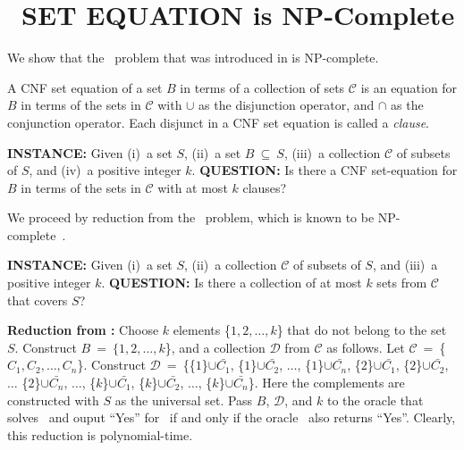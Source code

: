 \chapter{\textsf{\kcnf\ SET EQUATION} is NP-Complete}
\label{chapter:appendix:k-cnf}

We show that the \kcnfse\ problem that was introduced in
 is NP-complete. 

\begin{definition}
%
A CNF set equation of a set $B$ in terms of a collection of sets $\mathcal{C}$
is an equation for $B$ in terms of the sets in $\mathcal{C}$ with $\cup$ as the
disjunction operator, and $\cap$ as the conjunction operator. Each disjunct in
a CNF set equation is called a \textit{clause}.
%
\end{definition}


\begin{definition}
%
\textbf{INSTANCE:} Given (i)~a set $S$, (ii)~a set $B~\subseteq~S$, 
(iii)~a collection $\mathcal{C}$ of subsets of $S$, and (iv)~a positive
integer $k$.
%
\textbf{QUESTION:} Is there a CNF set-equation for $B$ in terms of the
sets in $\mathcal{C}$ with at most $k$ clauses?
%
\end{definition}

We proceed by reduction from the \setcov\ problem, which is known to be
NP-complete~\cite{garey-johnson}.


\begin{definition}
%
\textbf{INSTANCE:} Given (i)~a set $S$, (ii)~a collection $\mathcal{C}$ of
subsets of $S$, and (iii)~a positive integer $k$.
%
\textbf{QUESTION:} Is there a collection of at most $k$ sets from $\mathcal{C}$ 
that covers $S$?
%
\end{definition}



\noindent\textbf{Reduction from \setcov:} Choose $k$ elements
\{$1, 2, \ldots, k$\} that do not belong to the set $S$. Construct
$B~=~\{1, 2, \ldots, k$\}, and a collection $\mathcal{D}$ from $\mathcal{C}$ as
follows. Let $\mathcal{C}$~=~\{$C_1, C_2, \ldots, C_n$\}.  Construct
$\mathcal{D}$~=~\{\{$1$\}$\cup$$\bar{C_1}$, \{$1$\}$\cup$$\bar{C_2}$, $\ldots$,
\{$1$\}$\cup$$\bar{C_n}$, \{$2$\}$\cup$$\bar{C_1}$, \{$2$\}$\cup$$\bar{C_2}$,
$\ldots$ \{$2$\}$\cup$$\bar{C_n}$, $\ldots$, \{$k$\}$\cup$$\bar{C_1}$,
\{$k$\}$\cup$$\bar{C_2}$, $\ldots$, \{$k$\}$\cup$$\bar{C_n}$\}. Here the
complements are constructed with $S$ as the universal set. Pass $B$,
$\mathcal{D}$, and $k$ to the oracle that solves \kcnfse\ and ouput ``Yes'' for
\setcov\ if and only if the oracle \kcnfse\ also returns ``Yes''.  Clearly,
this reduction is polynomial-time. 

